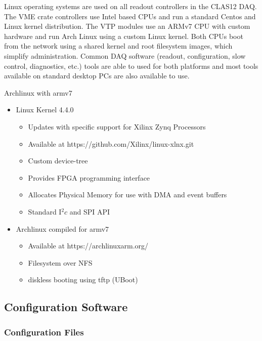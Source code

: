 Linux operating systems are used on all readout controllers in the CLAS12 DAQ. The VME crate controllers use Intel based CPUs and run a standard Centos and Linux kernel distribution. The VTP modules use an ARMv7 CPU with custom hardware and run Arch Linux using a custom Linux kernel. Both CPUs boot from the network using a shared kernel and root filesystem images, which simplify administration. Common DAQ software (readout, configuration, slow control, diagnostics, etc.) tools are able to used for both platforms and most tools available on standard desktop PCs are also available to use.

Archlinux with armv7

\begin{itemize}
\item Linux Kernel 4.4.0
  \begin{itemize}
  \item Updates with specific support for Xilinx Zynq Processors
  \item Available at https://github.com/Xilinx/linux-xlnx.git
  \item Custom device-tree
  \item Provides FPGA programming interface
  \item Allocates Physical Memory for use with DMA and event buffers
  \item Standard I$^2c$ and SPI API
  \end{itemize}

\item Archlinux compiled for armv7
  \begin{itemize}
  \item Available at https://archlinuxarm.org/
  \item Filesystem over NFS
  \item diskless booting using tftp (UBoot)
  \end{itemize}
\end{itemize}


\subsection{Configuration Software}

\subsubsection{Configuration Files}

